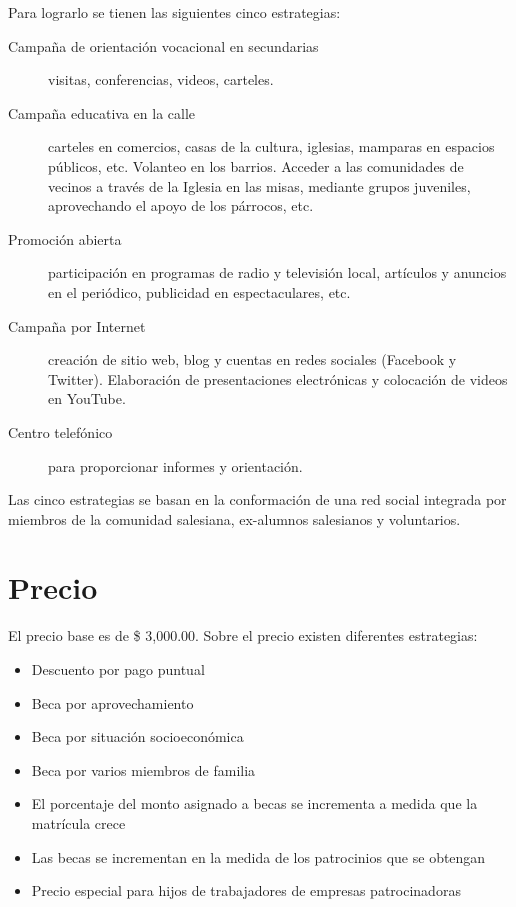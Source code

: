 Para lograrlo se tienen las siguientes cinco estrategias:

\begin{description}
	\item[Campaña de orientación vocacional en secundarias] visitas, conferencias, videos, carteles.
	\item[Campaña educativa en la calle] carteles en comercios, casas de la cultura, iglesias, mamparas en espacios públicos, etc. Volanteo en los barrios. Acceder a las comunidades de vecinos a través de la Iglesia en las misas, mediante grupos juveniles, aprovechando el apoyo de los párrocos, etc.
	\item[Promoción abierta] participación en programas de radio y televisión local, artículos y anuncios en el periódico, publicidad en espectaculares, etc.
	\item[Campaña por Internet] creación de sitio web, blog y cuentas en redes sociales (Facebook y Twitter). Elaboración de presentaciones electrónicas y colocación de videos en YouTube.
	\item[Centro telefónico] para proporcionar informes y orientación.
\end{description}

Las cinco estrategias se basan en la conformación de una red social integrada por miembros de la comunidad salesiana, ex-alumnos salesianos y voluntarios.

\section{Precio}

El precio base es de \$ 3,000.00. Sobre el precio existen diferentes estrategias:

\begin{itemize}
	\item Descuento por pago puntual
	\item Beca por aprovechamiento
	\item Beca por situación socioeconómica
	\item Beca por varios miembros de familia
	\item El porcentaje del monto asignado a becas se incrementa a medida que la matrícula crece
	\item Las becas se incrementan en la medida de los patrocinios que se obtengan
	\item Precio especial para hijos de trabajadores de empresas patrocinadoras
\end{itemize}
